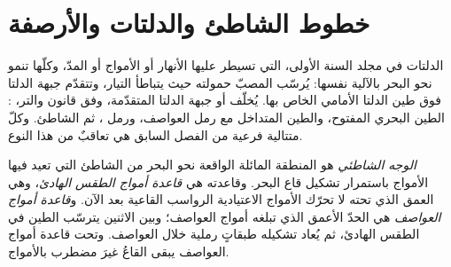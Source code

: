 \begin{omfigure}
\par{}\label{fig:b3:facies-models:rivers}
\end{omfigure}

\section{خطوط الشاطئ والدلتات والأرصفة}\label{sec:b3:facies-models:shelves}

الدلتات في مجلد السنة الأولى، التي تسيطر عليها الأنهار أو الأمواج أو المدّ، وكلّها
تنمو نحو البحر بالآلية نفسها: يُرسّب المصبّ حمولته حيث
يتباطأ التيار، وتتقدّم جبهة الدلتا فوق طين الدلتا الأمامي الخاص بها.
يُخلّف  أو جبهة الدلتا المتقدّمة، وفق قانون والتر، : الطين البحري المفتوح، والطين المتداخل مع رمل العواصف،
ورمل ، ثم الشاطئ. وكلّ متتالية فرعية من الفصل السابق هي
تعاقبٌ من هذا النوع.

\begin{definition}\label{def:b3:facies-models:shoreface}
\emph{الوجه الشاطئي} هو المنطقة المائلة الواقعة نحو البحر من
الشاطئ التي تعيد فيها الأمواج باستمرار تشكيل قاع البحر. وقاعدته هي
\emph{قاعدة أمواج الطقس الهادئ}، وهي العمق الذي تحته
لا تحرّك الأمواج الاعتيادية الرواسب القاعية بعد الآن. و\emph{قاعدة أمواج
العواصف} هي الحدّ الأعمق الذي تبلغه أمواج العواصف؛
وبين الاثنين يترسّب الطين في الطقس الهادئ، ثم يُعاد تشكيله طبقاتٍ رملية
خلال العواصف. وتحت قاعدة أمواج العواصف يبقى القاعُ غيرَ مضطرب بالأمواج.
\end{definition}

